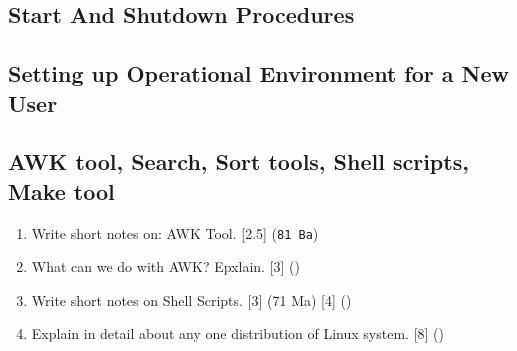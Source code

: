\documentclass[12pt]{article}
\begin{document}
	\subsection{Start And Shutdown Procedures}
	\subsection{Setting up Operational Environment for a New User}
	\subsection{AWK tool, Search, Sort tools, Shell scripts, Make tool}
		\begin{enumerate}[noitemsep, topsep=0pt]
			\item Write short notes on: AWK Tool. \hfill [2.5] (\texttt{81 Ba})

			\item What can we do with AWK? Epxlain. \hfill [3] ()

			\item Write short notes on Shell Scripts. \hfill [3] (71 Ma) [4] ()

			\item Explain in detail about any one distribution of Linux system. \hfill [8] ()
		\end{enumerate}
\end{document}
